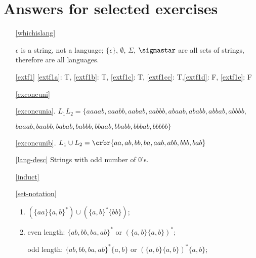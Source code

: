 \documentclass[11pt]{article}
\newcommand{\emptystring}{\ensuremath{\epsilon}}
\begin{document}
		\section{Answers for selected exercises}
\begin{itemize}

\item[\ref{whichislang}]\hypertarget{whichislangsol}{} 

$\emptystring$ is a string, not a language; $\{\emptystring\}$,
$\emptyset$, $\Sigma$, $\sigmastar$ are all
sets of strings, therefore are all languages. 

\item[\ref{extf1}]\hypertarget{extf1sol}{} \ref{extf1a}: T, \ref{extf1b}: T, \ref{extf1c}: T, \ref{extf1cc}: T,\ref{extf1d}: F, \ref{extf1e}: F

\item[\ref{exconcuni}]\hypertarget{exconcunisol}{}

\ref{exconcunia}.
$L_1L_2= \{aaaab,aaabb,aabab,aabbb,abaab,ababb,abbab,abbbb,$ 

$baaab, baabb, babab, babbb, bbaab,bbabb,bbbab,bbbbb\}$

\ref{exconcunib}. $L_1\cup L_2 =\crbr{
aa,
ab,
bb,
ba,
aab,
abb,
bbb,
bab}
$


\item[\ref{lang-desc}]\hypertarget{lang-desc-sol}{} Strings with odd number of 0's. 

\item[\ref{induct}]\hypertarget{induct-sol}{}


\item[\ref{set-notation}]\hypertarget{set-notationsol}{}
\begin{enumerate}
\item  $(\{aa\}\{a,b\}^*)\cup(\{a,b\}^*\{bb\})$;

\item even length:
$\{ab,bb,ba,ab\}^*$ or $(\{a,b\}\{a,b\})^*$;

odd length:
$\{ab,bb,ba,ab\}^*\{a,b\}$ or $(\{a,b\}\{a,b\})^*\{a,b\}$;


\end{enumerate}
\end{itemize}
\end{document}
